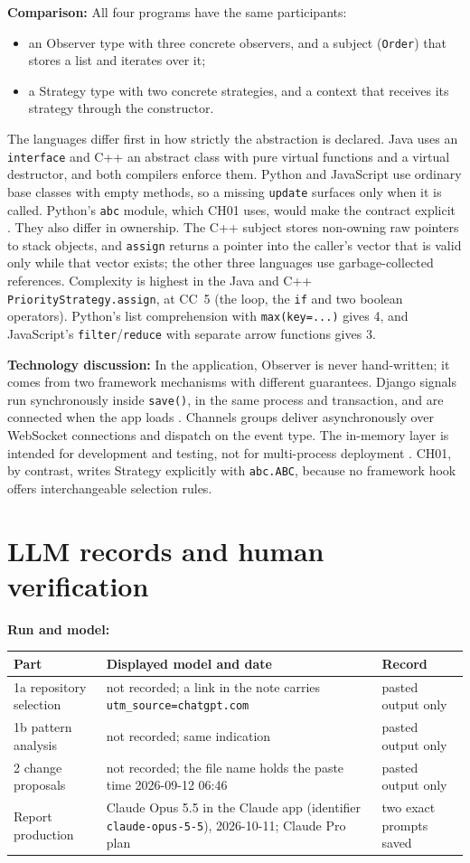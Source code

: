 \documentclass[11pt,a4paper]{article}
\newcommand{\entry}[1]{\par\textbf{#1:} }
\newcommand{\code}[1]{\nolinkurl{#1}}
\begin{document}
\entry{Comparison}All four programs have the same participants:
\begin{itemize}
\item an Observer type with three concrete observers, and a subject (\code{Order}) that stores a list and iterates over it;
\item a Strategy type with two concrete strategies, and a context that receives its strategy through the constructor.
\end{itemize}
The languages differ first in how strictly the abstraction is declared. Java uses an \code{interface} and C++ an abstract class with pure virtual functions and a virtual destructor, and both compilers enforce them. Python and JavaScript use ordinary base classes with empty methods, so a missing \code{update} surfaces only when it is called. Python's \code{abc} module, which CH01 uses, would make the contract explicit \cite{pyabc}. They also differ in ownership. The C++ subject stores non-owning raw pointers to stack objects, and \code{assign} returns a pointer into the caller's vector that is valid only while that vector exists; the other three languages use garbage-collected references. Complexity is highest in the Java and C++ \code{PriorityStrategy.assign}, at CC~5 (the loop, the \code{if} and two boolean operators). Python's list comprehension with \code{max(key=...)} gives 4, and JavaScript's \code{filter}/\code{reduce} with separate arrow functions gives 3.

\entry{Technology discussion}In the application, Observer is never hand-written; it comes from two framework mechanisms with different guarantees. Django signals run synchronously inside \code{save()}, in the same process and transaction, and are connected when the app loads \cite{djsignals}. Channels groups deliver asynchronously over WebSocket connections and dispatch on the event type. The in-memory layer is intended for development and testing, not for multi-process deployment \cite{channels}. CH01, by contrast, writes Strategy explicitly with \code{abc.ABC}, because no framework hook offers interchangeable selection rules.

\section{LLM records and human verification}
\entry{Run and model}\par
\begin{tabularx}{\linewidth}{@{}lXX@{}}\toprule
Part & Displayed model and date & Record\\\midrule
1a repository selection & not recorded; a link in the note carries \code{utm_source=chatgpt.com} & pasted output only\\
1b pattern analysis & not recorded; same indication & pasted output only\\
2 change proposals & not recorded; the file name holds the paste time 2026-09-12 06:46 & pasted output only\\
Report production & Claude Opus 5.5 in the Claude app (identifier \code{claude-opus-5-5}), 2026-10-11; Claude Pro plan & two exact prompts saved\\\bottomrule
\end{tabularx}
\end{document}

